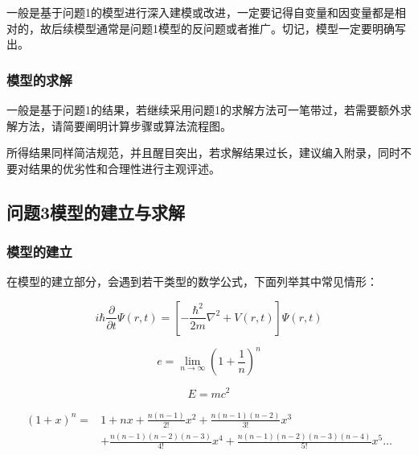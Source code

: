 \documentclass[12pt,utf8]{article}
\begin{document}
一般是基于问题1的模型进行深入建模或改进，一定要记得自变量和因变量都是相对的，故后续模型通常是问题1模型的反问题或者推广。切记，模型一定要明确写出。


\subsubsection{模型的求解}

一般是基于问题1的结果，若继续采用问题1的求解方法可一笔带过，若需要额外求解方法，请简要阐明计算步骤或算法流程图。

所得结果同样简洁规范，并且醒目突出，若求解结果过长，建议编入附录，同时不要对结果的优劣性和合理性进行主观评述。

\subsection{问题3模型的建立与求解}

\subsubsection{模型的建立}
在模型的建立部分，会遇到若干类型的数学公式，下面列举其中常见情形：

\begin{equation}\label{eq1}
  i\hbar\frac{\partial}{\partial t} \Psi(r,t)  = \left[
  -\frac{\hbar^2}{2m}\nabla^2+V(r,t) \right]\Psi(r,t) 
\end{equation}

\begin{equation*}
  e=\lim_{n\to\infty} \left(1+\frac{1}{n}\right)^n
\end{equation*}

\begin{equation}
   E = mc^2  \tag{MEE}
\end{equation}


\begin{equation}
\begin{aligned}
   \left(1+x\right)^n  =&  1 + nx + \frac{n\left(n-1\right)}{2!}x^2 
     + \frac{n\left(n-1\right)\left(n-2\right)}{3!}x^3 
     \\& + \frac{n\left(n-1\right)\left(n-2\right)\left(n-3\right)}{4!}x^4 
   +  \frac{n\left(n-1\right)\left(n-2\right)\left(n-3\right)\left(n-4\right)}{5!}x^5 \ldots
\end{aligned}
\end{equation}
\end{document}
